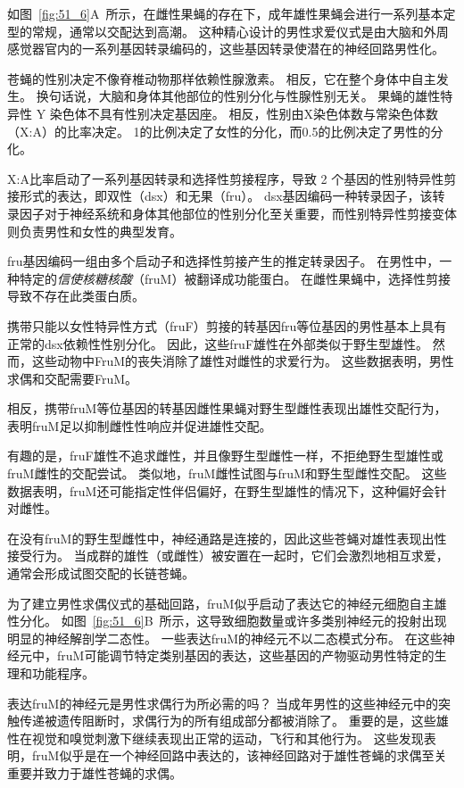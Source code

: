 \begin{proposition}[果蝇交配行为的遗传和神经控制] \label{box:51_1}
	
	\quad \quad 如图~\ref{fig:51_6}A~所示，在雌性果蝇的存在下，成年雄性果蝇会进行一系列基本定型的常规，通常以交配达到高潮。
	这种精心设计的男性求爱仪式是由大脑和外周感觉器官内的一系列基因转录编码的，这些基因转录使潜在的神经回路男性化。
	
	\quad \quad 苍蝇的性别决定不像脊椎动物那样依赖性腺激素。
	相反，它在整个身体中自主发生。
	换句话说，大脑和身体其他部位的性别分化与性腺性别无关。
	果蝇的雄性特异性 Y 染色体不具有性别决定基因座。
	相反，性别由X染色体数与常染色体数（X:A）的比率决定。
	1的比例决定了女性的分化，而0.5的比例决定了男性的分化。
	
	\quad \quad X:A比率启动了一系列基因转录和选择性剪接程序，导致 2 个基因的性别特异性剪接形式的表达，即双性（dsx）和无果（fru）。
	dsx基因编码一种转录因子，该转录因子对于神经系统和身体其他部位的性别分化至关重要，而性别特异性剪接变体则负责男性和女性的典型发育。
	
	\quad \quad fru基因编码一组由多个启动子和选择性剪接产生的推定转录因子。
	在男性中，一种特定的\textit{信使核糖核酸}（fruM）被翻译成功能蛋白。
	在雌性果蝇中，选择性剪接导致不存在此类蛋白质。
	
	\quad \quad 携带只能以女性特异性方式（fruF）剪接的转基因fru等位基因的男性基本上具有正常的dsx依赖性性别分化。
	因此，这些fruF雄性在外部类似于野生型雄性。
	然而，这些动物中FruM的丧失消除了雄性对雌性的求爱行为。
	这些数据表明，男性求偶和交配需要FruM。
	
	\quad \quad 相反，携带fruM等位基因的转基因雌性果蝇对野生型雌性表现出雄性交配行为，表明fruM足以抑制雌性性响应并促进雄性交配。
	
	\quad \quad 有趣的是，fruF雄性不追求雌性，并且像野生型雌性一样，不拒绝野生型雄性或fruM雌性的交配尝试。
	类似地，fruM雌性试图与fruM和野生型雌性交配。
	这些数据表明，fruM还可能指定性伴侣偏好，在野生型雄性的情况下，这种偏好会针对雌性。
	
	\quad \quad 在没有fruM的野生型雌性中，神经通路是连接的，因此这些苍蝇对雄性表现出性接受行为。
	当成群的雄性（或雌性）被安置在一起时，它们会激烈地相互求爱，通常会形成试图交配的长链苍蝇。
	
	\quad \quad 为了建立男性求偶仪式的基础回路，fruM似乎启动了表达它的神经元细胞自主雄性分化。
	如图~\ref{fig:51_6}B~所示，这导致细胞数量或许多类别神经元的投射出现明显的神经解剖学二态性。
	一些表达fruM的神经元不以二态模式分布。
	在这些神经元中，fruM可能调节特定类别基因的表达，这些基因的产物驱动男性特定的生理和功能程序。
	
	\quad \quad 表达fruM的神经元是男性求偶行为所必需的吗？
	当成年男性的这些神经元中的突触传递被遗传阻断时，求偶行为的所有组成部分都被消除了。
	重要的是，这些雄性在视觉和嗅觉刺激下继续表现出正常的运动，飞行和其他行为。
	这些发现表明，fruM似乎是在一个神经回路中表达的，该神经回路对于雄性苍蝇的求偶至关重要并致力于雄性苍蝇的求偶。
	
\end{proposition}



